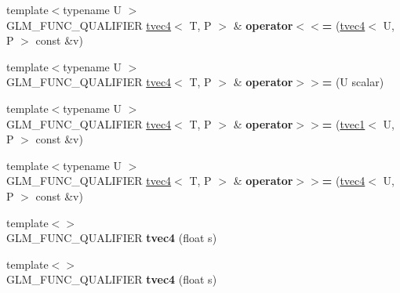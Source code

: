 \begin{DoxyCompactItemize}
\item 
\hypertarget{structglm_1_1tvec4_ab39a99917d9c3a7b93c1cf5cbfa93025}{{\footnotesize template$<$typename U $>$ }\\G\-L\-M\-\_\-\-F\-U\-N\-C\-\_\-\-Q\-U\-A\-L\-I\-F\-I\-E\-R \hyperlink{structglm_1_1tvec4}{tvec4}$<$ T, P $>$ \& {\bfseries operator$<$$<$=} (\hyperlink{structglm_1_1tvec4}{tvec4}$<$ U, P $>$ const \&v)}\label{structglm_1_1tvec4_ab39a99917d9c3a7b93c1cf5cbfa93025}

\item 
\hypertarget{structglm_1_1tvec4_a538540f7df0325aa90d503b150dfa561}{{\footnotesize template$<$typename U $>$ }\\G\-L\-M\-\_\-\-F\-U\-N\-C\-\_\-\-Q\-U\-A\-L\-I\-F\-I\-E\-R \hyperlink{structglm_1_1tvec4}{tvec4}$<$ T, P $>$ \& {\bfseries operator$>$$>$=} (U scalar)}\label{structglm_1_1tvec4_a538540f7df0325aa90d503b150dfa561}

\item 
\hypertarget{structglm_1_1tvec4_abfcea840ccebe4a644d60116955529ce}{{\footnotesize template$<$typename U $>$ }\\G\-L\-M\-\_\-\-F\-U\-N\-C\-\_\-\-Q\-U\-A\-L\-I\-F\-I\-E\-R \hyperlink{structglm_1_1tvec4}{tvec4}$<$ T, P $>$ \& {\bfseries operator$>$$>$=} (\hyperlink{structglm_1_1tvec1}{tvec1}$<$ U, P $>$ const \&v)}\label{structglm_1_1tvec4_abfcea840ccebe4a644d60116955529ce}

\item 
\hypertarget{structglm_1_1tvec4_aafc6289fa58e4d84390259bf8287cb72}{{\footnotesize template$<$typename U $>$ }\\G\-L\-M\-\_\-\-F\-U\-N\-C\-\_\-\-Q\-U\-A\-L\-I\-F\-I\-E\-R \hyperlink{structglm_1_1tvec4}{tvec4}$<$ T, P $>$ \& {\bfseries operator$>$$>$=} (\hyperlink{structglm_1_1tvec4}{tvec4}$<$ U, P $>$ const \&v)}\label{structglm_1_1tvec4_aafc6289fa58e4d84390259bf8287cb72}

\item 
\hypertarget{structglm_1_1tvec4_ab436750d22d1968f58d83b56ef3e6d74}{{\footnotesize template$<$$>$ }\\G\-L\-M\-\_\-\-F\-U\-N\-C\-\_\-\-Q\-U\-A\-L\-I\-F\-I\-E\-R {\bfseries tvec4} (float s)}\label{structglm_1_1tvec4_ab436750d22d1968f58d83b56ef3e6d74}

\item 
\hypertarget{structglm_1_1tvec4_a3f714b2f5b2f0ba20d38df5166fb112f}{{\footnotesize template$<$$>$ }\\G\-L\-M\-\_\-\-F\-U\-N\-C\-\_\-\-Q\-U\-A\-L\-I\-F\-I\-E\-R {\bfseries tvec4} (float s)}\label{structglm_1_1tvec4_a3f714b2f5b2f0ba20d38df5166fb112f}


\end{DoxyCompactItemize}
